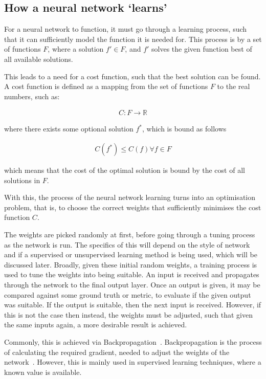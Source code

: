 \subsection{How a neural network `learns'}

For a neural network to function, it must go through a learning process, such
that it can sufficiently model the function it is needed for. This process is by
a set of functions $F$, where a solution $f' \in F$, and $f'$ solves the given
function best of all available solutions.

This leads to a need for a cost function, such that the best solution can be
found.  A cost function is defined as a mapping from the set of functions $F$ to
the real numbers, such as:

\begin{align}
    C : F \rightarrow \mathbb{R}
\end{align}

where there exists some optional solution $f^*$, which is bound as follows

\begin{align}
    C(f^*) \le C(f) \forall f \in F
\end{align}

which means that the cost of the optimal solution is bound by the cost of
all solutions in $F$.

With this, the process of the neural network learning turns into an optimisation
problem, that is, to choose the correct weights that sufficiently minimises the
cost function $C$.

The weights are picked randomly at first, before going through a tuning process
as the network is run. The specifics of this will depend on the style of network
and if a supervised or unsupervised learning method is being used, which will be
discussed later. Broadly, given these initial random weights, a training process
is used to tune the weights into being suitable. An input is received and
propagates through the network to the final output layer. Once an output is
given, it may be compared against some ground truth or metric, to evaluate if
the given output was suitable. If the output is suitable, then the next input
is received. However, if this is not the case then instead, the weights must be
adjusted, such that given the same inputs again, a more desirable result is
achieved.

Commonly, this is achieved via Backpropagation~\cite{hecht1992theory}.
Backpropagation is the process of calculating the required gradient, needed to
adjust the weights of the network~\cite{goodfellow2016deep}. However, this is
mainly used in supervised learning techniques, where a known value is available.


